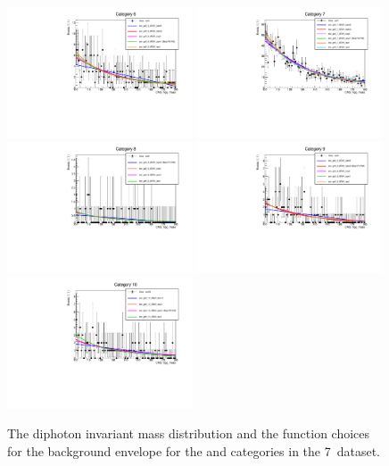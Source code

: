 \begin{figure}
  \includegraphics[width=0.49\textwidth]{analysis/plots/mva_8TeV/multipdf_cat6.pdf}
  \includegraphics[width=0.49\textwidth]{analysis/plots/mva_8TeV/multipdf_cat7.pdf}\\
  \includegraphics[width=0.49\textwidth]{analysis/plots/mva_8TeV/multipdf_cat8.pdf}
  \includegraphics[width=0.49\textwidth]{analysis/plots/mva_8TeV/multipdf_cat9.pdf}\\
  \includegraphics[width=0.49\textwidth]{analysis/plots/mva_8TeV/multipdf_cat10.pdf}
  \caption{The diphoton invariant mass distribution and the function choices for the background envelope for the \VH and \ttH categories in the 7~\TeV dataset. }
  \label{fig:multipdf3}
\end{figure}

